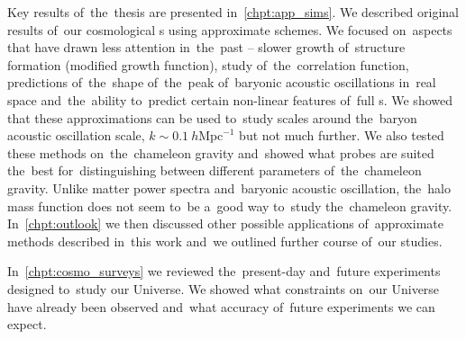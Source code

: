 Key results of~the~thesis are presented in~\autoref{chpt:app_sims}. We described original results of~our cosmological \nbodysim s using approximate schemes. We focused on~aspects that have drawn less attention in~the~past -- slower growth of~structure formation (modified growth function), study of~the~correlation function, predictions of~the~shape of~the~peak of~baryonic acoustic oscillations in~real space and~the~ability to~predict certain non-linear features of~full \nbodysim s. We showed that these approximations can be used to~study scales around the~baryon acoustic oscillation scale, $k\sim 0.1~h\text{Mpc}^{-1}$ but not much further. We also tested these methods on~the~chameleon gravity and~showed what probes are suited the~best for~distinguishing between different parameters of~the~chameleon gravity. Unlike matter power spectra and~baryonic acoustic oscillation, the~halo mass function does not seem to~be a~good way to~study the~chameleon gravity. In~\autoref{chpt:outlook} we then discussed other possible applications of~approximate methods described in~this work and~we outlined further course of~our studies.

In~\autoref{chpt:cosmo_surveys} we reviewed the~present-day and~future experiments designed to~study our Universe. We showed what constraints on~our Universe have already been observed and~what accuracy of~future experiments we can expect.

